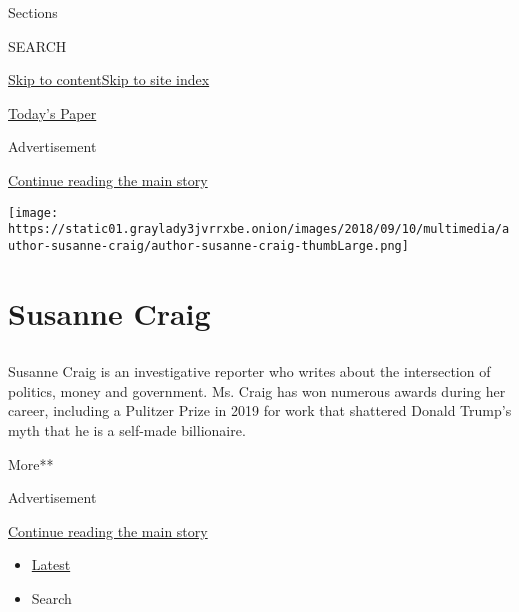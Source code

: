 Sections

SEARCH

\protect\hyperlink{site-content}{Skip to
content}\protect\hyperlink{site-index}{Skip to site index}

\href{https://myaccount.nytimes3xbfgragh.onion/auth/login?response_type=cookie\&client_id=vi}{}

\href{https://www.nytimes3xbfgragh.onion/section/todayspaper}{Today's
Paper}

Advertisement

\protect\hyperlink{after-top}{Continue reading the main story}

\texttt{[image: https://static01.graylady3jvrrxbe.onion/images/2018/09/10/multimedia/author-susanne-craig/author-susanne-craig-thumbLarge.png]}

\hypertarget{susanne-craig}{%
\section{Susanne Craig}\label{susanne-craig}}

\subsection{}

Susanne Craig is an investigative reporter who writes about the
intersection of politics, money and government. Ms. Craig has won
numerous awards during her career, including a Pulitzer Prize in 2019
for work that shattered Donald Trump's myth that he is a self-made
billionaire.

More**

Advertisement

\protect\hyperlink{after-mid1}{Continue reading the main story}

\begin{itemize}
\tightlist
\item
  \protect\hyperlink{stream-panel}{Latest}
\item
  Search
\end{itemize}

